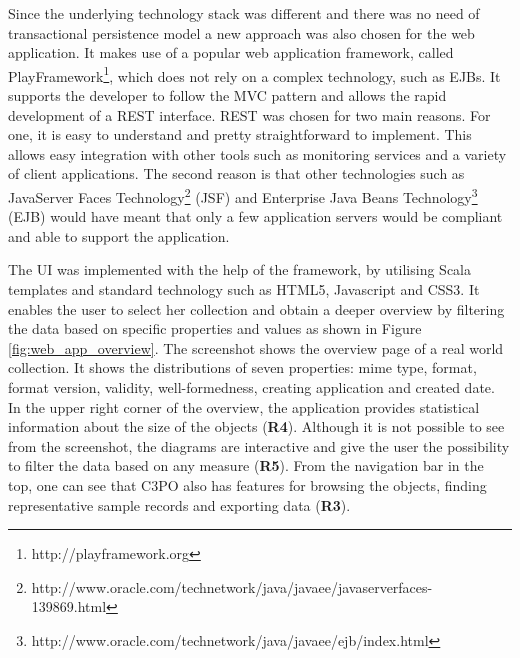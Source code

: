 Since the underlying technology stack was different and there was no need of transactional persistence model a new approach was also chosen for the web application. It makes use of a popular web application framework, called PlayFramework\footnote{http://playframework.org}, which does not rely on a complex technology, such as EJBs. It supports the developer to follow the MVC pattern and allows the rapid development of a REST \cite{Fielding:2000:ASD:932295} interface. REST was chosen for two main reasons. For one, it is easy to understand and pretty straightforward to implement. This allows easy integration with other tools such as monitoring services and a variety of client applications. The second reason is that other technologies such as JavaServer Faces Technology\footnote{http://www.oracle.com/technetwork/java/javaee/javaserverfaces-139869.html} (JSF) and Enterprise Java Beans Technology\footnote{http://www.oracle.com/technetwork/java/javaee/ejb/index.html} (EJB) would have meant that only a few application servers would be compliant and able to support the application.

The UI was implemented with the help of the framework, by utilising Scala templates and standard technology such as HTML5, Javascript and CSS3. It enables the user to select her collection and obtain a deeper overview by filtering the data based on specific properties and values as shown in Figure \ref{fig:web_app_overview}. The screenshot shows the overview page of a real world collection. It shows the distributions of seven properties: mime type, format, format version, validity, well-formedness, creating application and created date. In the upper right corner of the overview, the application provides statistical information about the size of the objects (\textbf{R4}). Although it is not possible to see from the screenshot, the diagrams are interactive and give the user the possibility to filter the data based on any measure (\textbf{R5}). From the navigation bar in the top, one can see that C3PO also has features for browsing the objects, finding representative sample records and exporting data (\textbf{R3}).

